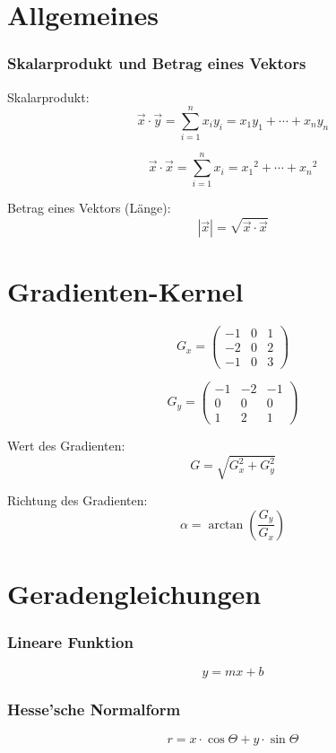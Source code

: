 

\UseHelveticaNeuetrue

\UseColumnstrue



\section{Allgemeines}
\subsubsection{Skalarprodukt und Betrag eines Vektors}
Skalarprodukt:
\[ \vec x\cdot \vec y = \sum_{i=1}^n x_iy_i = {x_1}{y_1}+\dotsb + {x_n}{y_n} \]

\[ \vec x\cdot \vec x = \sum_{i=1}^n x_i = {x_1}^2 +\dotsb + {x_n}^2 \]

Betrag eines Vektors (Länge):
\[ |\vec x| = \sqrt{\vec x \cdot \vec x} \]

\section{Gradienten-Kernel}

\[ G_x = \begin{pmatrix}
-1 & 0 & 1 \\
-2 & 0 & 2 \\
-1 & 0 & 3
\end{pmatrix} \]

\[ G_y = \begin{pmatrix}
-1 & -2 & -1 \\
0 & 0 & 0 \\
1 & 2 & 1
\end{pmatrix} \]

Wert des Gradienten:
\[ G = \sqrt{G_x^2 + G_y^2} \]

Richtung des Gradienten:
\[ \alpha = \arctan\left(\frac{G_y}{G_x}\right) \]


\section{Geradengleichungen}

\subsubsection{Lineare Funktion}
\[ y = mx + b \]

\subsubsection{Hesse'sche Normalform}
\[ r = x \cdot \cos \Theta + y \cdot \sin \Theta \]


